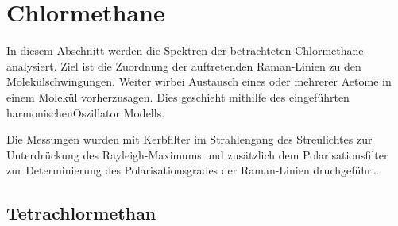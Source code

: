 \documentclass[../bericht.tex]{subfiles}
\begin{document}
    \section{Chlormethane}

      In diesem Abschnitt werden die Spektren der betrachteten Chlormethane analysiert. Ziel ist die Zuordnung der auftretenden Raman-Linien zu den  Molekülschwingungen. Weiter wirbei Austausch eines oder mehrerer Aetome in einem Molekül vorherzusagen. Dies geschieht mithilfe des eingeführten harmonischenOszillator Modells.

      Die Messungen wurden mit Kerbfilter im Strahlengang des Streulichtes zur Unterdrückung des Rayleigh-Maximums und zusätzlich dem Polarisationsfilter zur Determinierung des Polarisationsgrades der Raman-Linien druchgeführt.


      \subsection{Tetrachlormethan}
      \label{subsec:tetrachlor}
\end{document}
